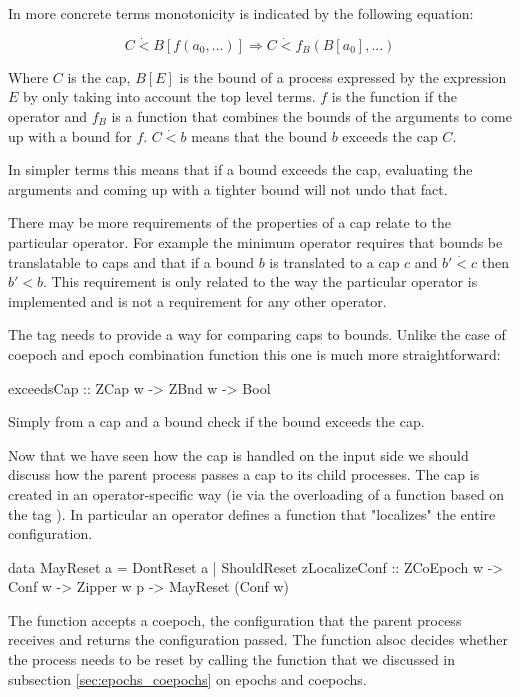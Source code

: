 In more concrete terms monotonicity is indicated by the following
equation:

\[
C \dot{<} B[ f(a_0, ...)] \Rightarrow C \dot{<} f_B(B[a_0],...)
\]

Where \(C\) is the cap, \(B[E]\) is the bound of a process expressed
by the expression \(E\) by only taking into account the top level
terms. \(f\) is the function if the operator and \(f_B\) is a function
that combines the bounds of the arguments to come up with a bound for
\(f\). \(C \dot{<} b\) means that the bound \(b\) exceeds the cap
\(C\).

In simpler terms this means that if a bound exceeds the cap,
evaluating the arguments and coming up with a tighter bound will not
undo that fact.

There may be more requirements of the properties of a cap relate to
the particular operator. For example the minimum operator requires
that bounds be translatable to caps and that if a bound \(b\) is
translated to a cap \(c\) and \(b' \dot{<} c\) then \(b' < b\). This
requirement is only related to the way the particular operator is
implemented and is not a requirement for any other operator.


The  tag needs to provide a way for comparing caps
to bounds. Unlike the case of coepoch and epoch combination function
this one is much more straightforward:

\begin{haskellcode}
exceedsCap :: ZCap w -> ZBnd w -> Bool
\end{haskellcode}

Simply from a cap and a bound check if the bound exceeds the cap.

Now that we have seen how the cap is handled on the input side we
should discuss how the parent process passes a cap to its child
processes. The cap is created in an operator-specific way (ie via the
overloading of a function based on the tag ). In particular an
operator defines a function that "localizes" the entire configuration.

\begin{haskellcode}
data MayReset a = DontReset a | ShouldReset
zLocalizeConf :: ZCoEpoch w -> Conf w -> Zipper w p -> MayReset (Conf w)
\end{haskellcode}

The  function accepts a coepoch, the configuration
that the parent process receives and returns the configuration
passed. The  function alsoc decides whether the
process needs to be reset by calling the 
function that we discussed in subsection \ref{sec:epochs_coepochs} on
epochs and coepochs.


